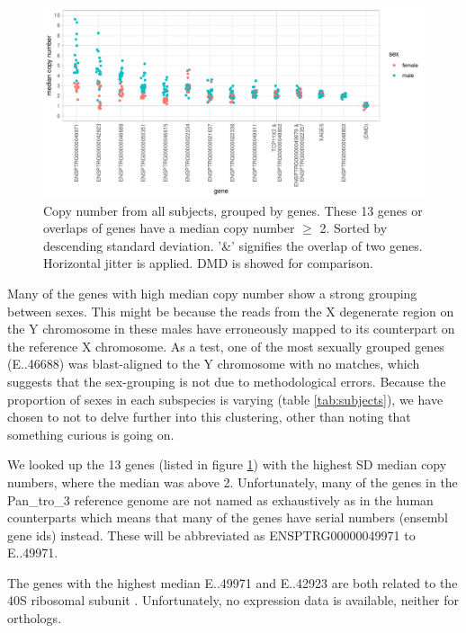 \begin{figure}[h] 
  \centering
  \includegraphics[scale=0.78]{figures/fig_main_3.pdf}
  \caption{Copy number from all subjects, grouped by genes. %
  These 13 genes or overlaps of genes have a median copy number $\geq$ 2. Sorted by descending standard deviation. '\&' signifies the overlap of two genes. Horizontal jitter is applied. DMD is showed for comparison. }
  \label{fig:fig_main}
\end{figure}

Many of the genes with high median copy number show a strong grouping between sexes. This might be because the reads from the X degenerate region on the Y chromosome\cite{skaletsklyMSY} in these males have erroneously mapped to its counterpart on the reference X chromosome. 
As a test, one of the most sexually grouped genes (E..46688) was blast-aligned to the Y chromosome with no matches, which suggests that the sex-grouping is not due to methodological errors. Because the proportion of sexes in each subspecies is varying (table \ref{tab:subjects}), we have chosen to not to delve further into this clustering, other than noting that something curious is going on. 

We looked up the 13 genes (listed in figure \ref{fig:fig_main}) with the highest SD median copy numbers, where the median was above 2. Unfortunately, many of the genes in the Pan\_tro\_3 reference genome are not named as exhaustively as in the human counterparts which means that many of the genes have serial numbers (ensembl gene ids) instead. These will be abbreviated as ENSPTRG00000049971 to E..49971. 

The genes with the highest median E..49971 and E..42923 are both related to the 40S ribosomal subunit \cite{ensembl}. Unfortunately, no expression data is available, neither for orthologs.


